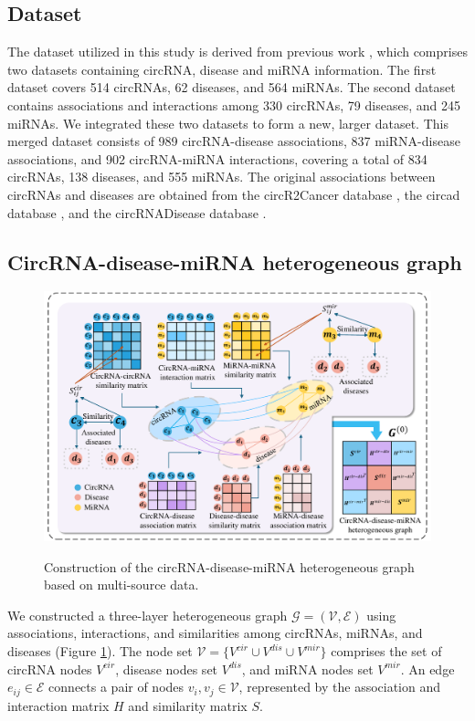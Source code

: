 \documentclass[journal,twoside,web]{ieeecolor}
\begin{document}
\subsection{Dataset}

The dataset utilized in this study is derived from previous work \cite{lan2022kgancda}, which comprises two datasets containing circRNA, disease and miRNA information. The first dataset covers 514 circRNAs, 62 diseases, and 564 miRNAs. The second dataset contains associations and interactions among 330 circRNAs, 79 diseases, and 245 miRNAs. We integrated these two datasets to form a new, larger dataset. This merged dataset consists of 989 circRNA-disease associations, 837 miRNA-disease associations, and 902 circRNA-miRNA interactions, covering a total of 834 circRNAs, 138 diseases, and 555 miRNAs. The original associations between circRNAs and diseases are obtained from the circR2Cancer database \cite{lan2020circr2cancer}, the circad database \cite{rophina2020circad}, and the circRNADisease database \cite{zhao2018circrna}.

\subsection{CircRNA-disease-miRNA heterogeneous graph}

\begin{figure}[!t]
	\centering
	\includegraphics[width=5in]{fig/visio2.pdf}\\
	\caption{Construction of the circRNA-disease-miRNA heterogeneous graph based on multi-source data.}
	\label{fig:visio2}
	\vspace{-0.4cm}
\end{figure}

We constructed a three-layer heterogeneous graph $\mathcal{G}=(\mathcal{V}, \mathcal{E})$ using associations, interactions, and similarities among circRNAs, miRNAs, and diseases (Figure \ref{fig:visio2}). The node set $\mathcal{V}=\{V^{cir}\cup V^{dis}\cup V^{mir}\}$ comprises the set of circRNA nodes $V^{cir}$, disease nodes set $V^{dis}$, and miRNA nodes set $V^{mir}$. An edge $e_{ij} \in \mathcal{E}$ connects a pair of nodes $v_i,v_j \in \mathcal{V}$, represented by the association and interaction matrix $H$ and similarity matrix $S$.
\end{document}
